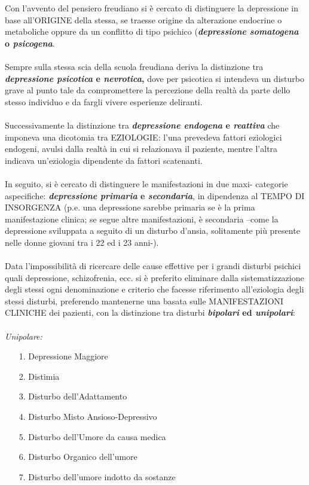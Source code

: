 Con l'avvento del pensiero freudiano si è cercato di distinguere la
depressione in base all'ORIGINE della stessa, se traesse origine da
alterazione endocrine o metaboliche oppure da un conflitto di tipo
psichico (\textbf{\emph{depressione somatogena} o \emph{psicogena}}.
\\\\
Sempre sulla stessa scia della scuola freudiana deriva la distinzione
tra \textbf{\emph{depressione psicotica} e \emph{nevrotica},} dove per
psicotica si intendeva un disturbo grave al punto tale da compromettere
la percezione della realtà da parte dello stesso individuo e da fargli
vivere esperienze deliranti.
\\\\
Successivamente la distinzione tra \textbf{\emph{depressione endogena} e
\emph{reattiva}} che imponeva una dicotomia tra EZIOLOGIE: l'una
prevedeva fattori eziologici endogeni, avulsi dalla realtà in cui si
relazionava il paziente, mentre l'altra indicava un'eziologia dipendente
da fattori scatenanti.
\\\\
In seguito, si è cercato di distinguere le manifestazioni in due maxi-
categorie aspecifiche: \textbf{\emph{depressione} \emph{primaria} e
\emph{secondaria}}, in dipendenza al TEMPO DI INSORGENZA (p.e. una
depressione sarebbe primaria se è la prima manifestazione clinica; se
segue altre manifestazioni, è secondaria --come la depressione
sviluppata a seguito di un disturbo d'ansia, solitamente più presente
nelle donne giovani tra i 22 ed i 23 anni-).
\\\\
Data l'impossibilità di ricercare delle cause effettive per i grandi
disturbi psichici quali depressione, schizofrenia, ecc. si è preferito
eliminare dalla sistematizzazione degli stessi ogni denominazione e
criterio che facesse riferimento all'eziologia degli stessi disturbi,
preferendo mantenerne una basata sulle MANIFESTAZIONI CLINICHE dei
pazienti, con la distinzione tra disturbi \textbf{\emph{bipolari} ed
\emph{unipolari}}:
\\\\
\emph{Unipolare: }

\begin{itemize}
\item[1.]
  Depressione Maggiore
\item[2.]
  Distimia
\item[3.]
  Disturbo dell'Adattamento
\item[4.]
  Disturbo Misto Ansioso-Depressivo
\item[5.]
  Disturbo dell'Umore da causa medica
\item[6.]
  Disturbo Organico dell'umore
\item[7.]
  Disturbo dell'umore indotto da sostanze
\end{itemize}

